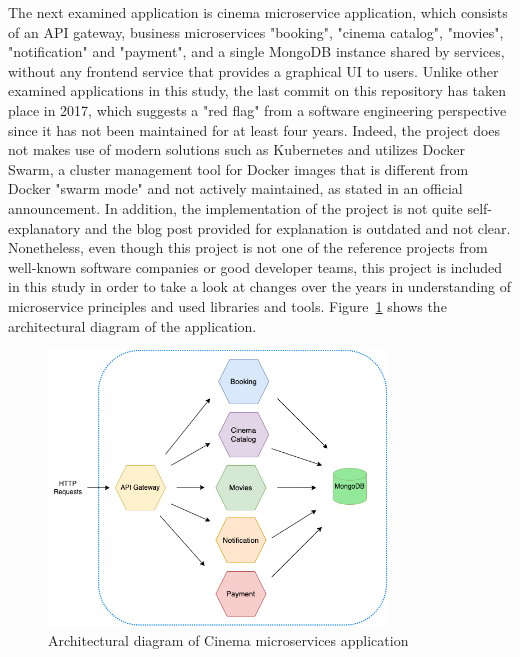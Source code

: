 \documentclass{Configuration_Files/PoliMi3i_thesis}
\begin{document}
The next examined application is cinema microservice application, which consists of an API gateway, business microservices "booking", "cinema catalog", "movies", "notification" and "payment", and a single MongoDB instance shared by services, without any frontend service that provides a graphical UI to users.
Unlike other examined applications in this study, the last commit on this repository has taken place in 2017, which suggests a "red flag" from a software engineering perspective since it has not been maintained for at least four years.
Indeed, the project does not makes use of modern solutions such as Kubernetes and utilizes Docker Swarm, a cluster management tool for Docker images that is different from Docker "swarm mode" and not actively maintained, as stated in an official announcement\footnotemark[100].
In addition, the implementation of the project is not quite self-explanatory and the blog post provided for explanation is outdated and not clear.
Nonetheless, even though this project is not one of the reference projects from well-known software companies or good developer teams, this project is included in this study in order to take a look at changes over the years in understanding of microservice principles and used libraries and tools.
Figure~\ref{fig:R7_arch} shows the architectural diagram of the application.

\begin{figure}[H]
\centering
\includegraphics[width=0.8\textwidth]{myImages/R7.png}
\caption{Architectural diagram of Cinema microservices application}
\label{fig:R7_arch}
\end{figure}
\end{document}
